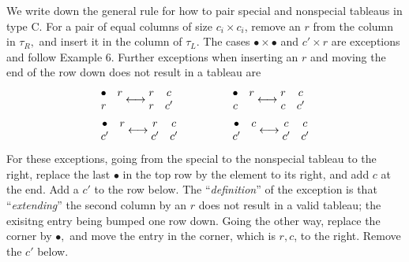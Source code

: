 \documentclass[11pt ,reqno]{amsart}
\begin{document}
We write down the general rule for how to pair special and nonspecial
tableaus in type C.  For a pair of equal columns of size $c_i\times c_i$, remove
an $r$ from the column in $\tau_R,$ and insert it in the column  of
$\tau_L$. The cases $\bullet\times\bullet$ and $c'\times r$ are
exceptions and follow Example 6. Further exceptions when inserting an
$r$ and moving the end of the row down does not result in a tableau are
$$
\begin{aligned}
  &\begin{matrix}
  \bullet&r\\r&\end{matrix}\longleftrightarrow\begin{matrix} r&c\\ r&c'\end{matrix}\qquad &&\qquad  \begin{matrix} \bullet&r\\ c&\end{matrix}\longleftrightarrow\begin{matrix} r&c\\ c&c'\end{matrix}\\
&\begin{matrix}\bullet&r\\ c'&\end{matrix}\longleftrightarrow \begin{matrix} r& c\\ c'& c'\end{matrix}
\qquad&&\qquad
\begin{matrix}\bullet&c\\ c'& \end{matrix}\longleftrightarrow\begin{matrix} c&c\\ c'&c'\end{matrix}
\end{aligned}
$$
{For these exceptions, going from the special to the
  nonspecial tableau to the right,   replace the last $\bullet$ in the
  top row by the element to its   right, and add  $c$ at the end.  Add
  a $c'$ to the row below. The ``\textit{definition}'' of   the
  exception is that ``\textit{extending}'' the second column by an $r$
  does not result in a valid tableau; the exisitng entry being bumped
  one row down. Going the   other
  way, replace the corner by $\bullet,$ and move the entry in the
  corner, which is $r,c$, to the right. Remove the $c'$ below}.  
\end{document}
